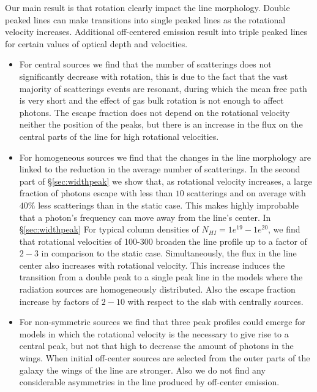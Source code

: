 \documentclass{emulateapj}
\newcommand{\ly}{{\ifmmode{{\rm Ly}\alpha~}\else{Ly$\alpha$~}\fi}}
\newcommand{\kms}{{\ifmmode{{\mathrm{\,km\ s}^{-1}}}\else{\,km~s$^{-1}$}\fi}}
\begin{document}
Our main result is that rotation clearly impact the \ly line
morphology. Double peaked lines can make transitions into single
peaked lines as the rotational velocity increases. Additional
off-centered emission result into triple peaked lines for certain 
values of optical depth and velocities. 

\begin{itemize}
\item For central sources we find that the number of scatterings
does not significantly decrease with rotation, this is due to the 
fact that the vast majority of scatterings events are resonant, 
during which the mean free path is very short and the effect of gas
bulk rotation is not enough to affect \ly photons.
The escape fraction does not depend on the rotational velocity neither
the position of the peaks, but there is an increase 
in the flux on the central parts of the line for high rotational 
velocities.

\item For homogeneous sources we find that the changes in the
line morphology are linked to the reduction in the average number of
scatterings. In the second part of \S \ref{sec:widthpeak} we show
that, as rotational velocity increases, a large fraction of photons
escape with less than $10$ scatterings and on average 
with $40\%$ less scatterings than in the static case. This makes highly improbable 
that a photon's frequency can move away from the line's center. 
In \S \ref{sec:widthpeak} For typical column densities of $N_{HI}=1e^{19}-1e^{20}$, 
we find that rotational velocities of 100-300 \kms broaden the line profile up 
to a factor of $2-3$ in comparison to the static case. Simultaneously, the
flux in the line center also increases with rotational velocity. This
increase induces the transition from a double peak to a single peak
line in the models where the radiation sources are homogeneously
distributed. Also the escape fraction increase by factors of $2-10$ with 
respect to the slab with centrally sources.

\item For non-symmetric sources we find that three peak profiles
could emerge for models in which the rotational velocity is the necessary 
to give rise to a central peak, but not that high to decrease the
amount of photons in the wings. When initial off-center sources are 
selected from the outer parts of the galaxy the wings of the line are stronger.
Also we do not find any considerable asymmetries in the line produced by off-center 
emission.
\end{itemize}
\end{document}
